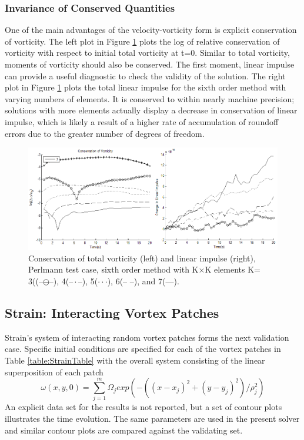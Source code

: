 \documentclass[]{aiaa-tc}%
\newcommand{\ben}[1]{\begin{equation}\label{#1}}
\newcommand{\ee}{\end{equation}}
\begin{document}
\subsubsection{Invariance of Conserved Quantities}\label{PConserveW}
One of the main advantages of the velocity-vorticity form is explicit conservation of vorticity. The left plot in Figure \ref{fig:PW_LinImpconserve} plots the log of relative conservation of vorticity with respect to initial total vorticity at t=0. Similar to total vorticity, moments of vorticity should also be conserved. The first moment, linear impulse can provide a useful diagnostic to check the validity of the solution. The right plot in Figure \ref{fig:PW_LinImpconserve} plots the total linear impulse for the sixth order method with varying numbers of elements. It is conserved to within nearly machine precision; solutions with more elements actually display a decrease in conservation of linear impulse, which is likely a result of a higher rate of accumulation of roundoff errors due to the greater number of degrees of freedom.

\begin{figure}
\centering
\includegraphics[width=1\textwidth]{PW_LinImpconserve.png}
\caption{\label{fig:PW_LinImpconserve}Conservation of total vorticity (left) and linear impulse (right), Perlmann test case, sixth order method with K$\times$K elements K= 3((--\!$\ominus$\!--), 4(--\,$\cdot$\,--), 5($\cdot \cdot \cdot$), 6(--{ }--), and 7(---).}
\end{figure}

\subsection{Strain: Interacting Vortex Patches}
Strain's system of interacting random vortex patches \cite{Strain1996} forms the next validation case. Specific initial conditions are specified for each of the vortex patches in Table \ref{table:StrainTable} with the overall system consisting of the linear superposition of each patch
\ben{StrainV} \omega(x,y,0) = \sum_{j=1}^m \Omega_j exp(-((x-x_j)^2 + (y-y_j)^2)/\rho_j^2) \ee
An explicit data set for the results is not reported, but a set of contour plots illustrates the time evolution. The same parameters are used in the present solver and similar contour plots are compared against the validating set.
\end{document}
